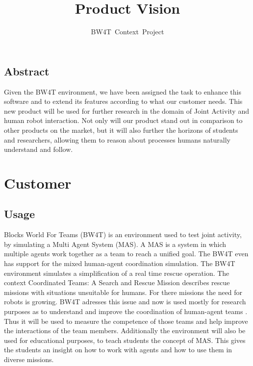 \documentclass[oneside]{tudelft-report}
\begin{document}
\frontmatter

\title[Blocks World for Teams]{Product Vision}
\author{BW4T~Context~Project}
\makecover

\mainmatter	


\pagebreak
\section*{Abstract}
Given the BW4T environment, we have been assigned the task to enhance this software and to extend its features according to what our customer needs. This new product will be used for further research in the domain of Joint Activity and human robot interaction. Not only will our product stand out in comparison to other products on the market, but it will also further the horizons of students and researchers, allowing them to reason about processes humans naturally understand and follow.


\pagebreak
\tableofcontents
\pagebreak

\chapter{Customer}

\section{Usage}
Blocks World For Teams (BW4T) \cite{bw4t} is an environment used to test joint activity, by simulating a Multi Agent System (MAS). A MAS is a system in which multiple agents work together as a team to reach a unified goal. The BW4T even has support for the mixed human-agent coordination simulation. The BW4T environment simulates a simplification of a real time rescue operation. The context Coordinated Teams: A Search and Rescue Mission \cite{context} describes rescue missions with situations unsuitable for humans. For there missions the need for robots is growing. BW4T adresses this issue and now is used mostly for research purposes as to understand and improve the coordination of human-agent teams \cite{humanagent}. Thus it will be used to measure the competence of those teams and help improve the interactions of the team members. Additionally the environment will also be used for educational purposes, to teach students the concept of MAS. This gives the students an insight on how to work with agents and how to use them in diverse missions.
\end{document}
